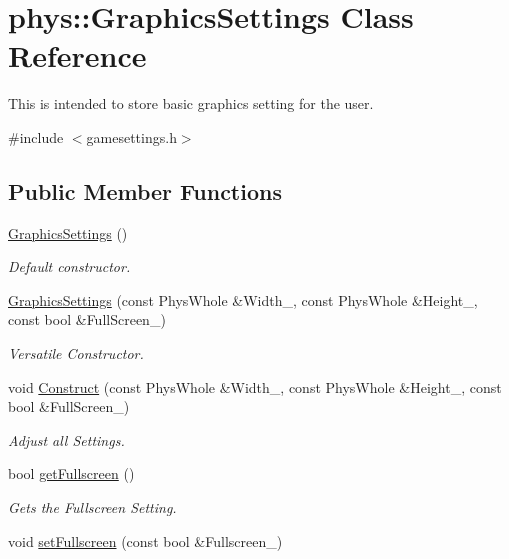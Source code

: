 \hypertarget{classphys_1_1GraphicsSettings}{
\section{phys::GraphicsSettings Class Reference}
\label{dc/df1/classphys_1_1GraphicsSettings}
}


This is intended to store basic graphics setting for the user.  


{\ttfamily \#include $<$gamesettings.h$>$}\subsection*{Public Member Functions}
\begin{DoxyCompactItemize}
\item 
\hyperlink{classphys_1_1GraphicsSettings_aceaaf53585413067adbf271e2c1e48fa}{GraphicsSettings} ()
\begin{DoxyCompactList}\small\item\em Default constructor. \item\end{DoxyCompactList}\item 
\hyperlink{classphys_1_1GraphicsSettings_a58d20902f41ddf10db9f9a810a3910cc}{GraphicsSettings} (const PhysWhole \&Width\_\-, const PhysWhole \&Height\_\-, const bool \&FullScreen\_\-)
\begin{DoxyCompactList}\small\item\em Versatile Constructor. \item\end{DoxyCompactList}\item 
void \hyperlink{classphys_1_1GraphicsSettings_aa8107167a2094f757f409db36e088171}{Construct} (const PhysWhole \&Width\_\-, const PhysWhole \&Height\_\-, const bool \&FullScreen\_\-)
\begin{DoxyCompactList}\small\item\em Adjust all Settings. \item\end{DoxyCompactList}\item 
bool \hyperlink{classphys_1_1GraphicsSettings_ab158ef7c277f354e71088f3e69c511d0}{getFullscreen} ()
\begin{DoxyCompactList}\small\item\em Gets the Fullscreen Setting. \item\end{DoxyCompactList}\item 
void \hyperlink{classphys_1_1GraphicsSettings_aba9e127ab2cf3f20604313e39d32f7a8}{setFullscreen} (const bool \&Fullscreen\_\-)

\end{DoxyCompactItemize}
